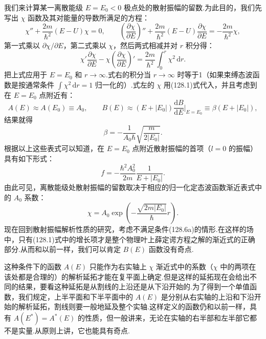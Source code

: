 我们来计算某一离散能级 $E=E_0<0$ 极点处的散射振幅的留数.为此目的，我们先写出 $\chi$ 函数及其对能量的导数所满足的方程：
\begin{equation*}
  \chi''+\frac{2m}{\hbar^2}(E-U)\chi=0,\qquad
  \left(\frac{\partial\chi}{\partial E}\right)''
  +\frac{2m}{\hbar^2}(E-U)\frac{\partial\chi}{\partial E}
  =-\frac{2m}{\hbar^2}\chi,
\end{equation*}
第一式乘以 $\partial\chi/\partial E$，第二式乘以 $\chi$，然后两式相减并对 $r$ 积分得：
\begin{equation}
  \chi'\frac{\partial\chi}{\partial E}
  -\chi\left(\frac{\partial\chi}{\partial E}\right)'
  =\frac{2m}{\hbar^2}\int_0^{r}\chi^2\,\mathrm{d}r.
\end{equation}
把上式应用于 $E=E_0$ 和 $r\to\infty$.式右的积分当 $r\to\infty$ 时等于1（如果束缚态波函数是按通常条件 $\int\chi^2\,\mathrm{d}r=1$ 归一化的）.式左的 $\chi$ 用(128.1)式代入，并且考虑到在 $E=E_0$ 点附近有：
\begin{equation*}
  A(E)\approx A(E_0)\equiv A_0,\qquad
  B(E)\approx(E+|E_0|)\frac{\mathrm{d}B}{\mathrm{d}E}\bigg|_{E=E_0}
  \equiv\beta(E+|E_0|),
\end{equation*}
结果就得
\begin{equation*}
  \beta=-\frac{1}{A_0\hbar}\sqrt{\frac{m}{2|E_0|}}.
\end{equation*}
根据以上这些表式可以知道，在 $E=E_0$ 点附近散射振幅的首项（$l=0$ 的振幅）具有如下形式：
\begin{equation}
  f=-\frac{\hbar^2A_0^2}{2m}\frac{1}{E+|E_0|}.
\end{equation}
由此可见，离散能级处散射振幅的留数取决于相应的归一化定态波函数渐近表式中的 $A_0$ 系数：
\begin{equation}
  \chi=A_0\exp\left(-\frac{\sqrt{2m|E_0|}}{\hbar}r\right).
\end{equation}
现在回到散射振幅解析性质的研究，考虑不满足条件(128.6a)的情形.在这样的场中，只有(128.1)式中的增长项才是整个物理叶上薛定谔方程之解的渐近式的正确部分.从而和以前一样，我们可以肯定 $B(E)$ 函数没有奇点.

这种条件下的函数 $A(E)$ 只能作为右实轴上 $\chi$ 渐近式中的系数（$\chi$ 中的两项在该处都是合理的）的解析延拓才能在复平面上确定.但是这样的延拓现在会给出不同的结果，要看这种延拓是从割线的上沿还是从下沿开始的.为了得到一个单值函数，我们规定，上半平面和下半平面中的 $A(E)$ 是分别从右实轴的上沿和下沿开始的解析延拓，割线则要一般地延及整个实轴.这样定义的函数仍和以前一样，具有 $A(E^{*})=A^{*}(E)$ 的性质，但一般讲来，无论在实轴的右半部和左半部它都不是实量.从原则上讲，它也能具有奇点.

